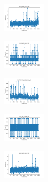 \begin{figure}[H]
\begin{subfigure}
    \end{subfigure}
    \hfill
    \begin{subfigure}
        \centering
        \includegraphics[width=0.234\textwidth]{img/aggsf/ecoli_set_const_20_589741062_time.png}
    \end{subfigure}
    \hfill
    \begin{subfigure}
        \centering
        \includegraphics[width=0.234\textwidth]{img/aggsf/rand_set_const_20_589741062_time.png}
    \end{subfigure}
    \hfill
    \begin{subfigure}
        \centering
        \includegraphics[width=0.234\textwidth]{img/aggsf/newthyroid_set_const_20_589741062_time.png}
    \end{subfigure}
    \hfill
    \begin{subfigure}
        \centering
        \includegraphics[width=0.234\textwidth]{img/aggsf/iris_set_const_20_277451237_time.png}
    \end{subfigure}
    \hfill
    \begin{subfigure}
        \centering
        \includegraphics[width=0.234\textwidth]{img/aggsf/ecoli_set_const_20_277451237_time.png}
    \end{subfigure}
    \hfill

\end{figure}
